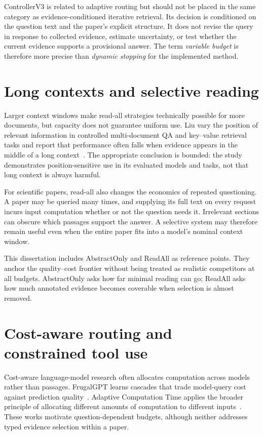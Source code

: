 ControllerV3 is related to adaptive routing but should not be placed in the same category as evidence-conditioned iterative retrieval. Its decision is conditioned on the question text and the paper's explicit structure. It does not revise the query in response to collected evidence, estimate uncertainty, or test whether the current evidence supports a provisional answer. The term \emph{variable budget} is therefore more precise than \emph{dynamic stopping} for the implemented method.

\section{Long contexts and selective reading}

Larger context windows make read-all strategies technically possible for more documents, but capacity does not guarantee uniform use. Liu \etal{} vary the position of relevant information in controlled multi-document QA and key--value retrieval tasks and report that performance often falls when evidence appears in the middle of a long context~\cite{liu2024lost}. The appropriate conclusion is bounded: the study demonstrates position-sensitive use in its evaluated models and tasks, not that long context is always harmful.

For scientific papers, read-all also changes the economics of repeated questioning. A paper may be queried many times, and supplying its full text on every request incurs input computation whether or not the question needs it. Irrelevant sections can obscure which passages support the answer. A selective system may therefore remain useful even when the entire paper fits into a model's nominal context window.

This dissertation includes AbstractOnly and ReadAll as reference points. They anchor the quality--cost frontier without being treated as realistic competitors at all budgets. AbstractOnly asks how far minimal reading can go; ReadAll asks how much annotated evidence becomes coverable when selection is almost removed.

\section{Cost-aware routing and constrained tool use}

Cost-aware language-model research often allocates computation across models rather than passages. FrugalGPT learns cascades that trade model-query cost against prediction quality~\cite{chen2024frugalgpt}. Adaptive Computation Time applies the broader principle of allocating different amounts of computation to different inputs~\cite{graves2016act}. These works motivate question-dependent budgets, although neither addresses typed evidence selection within a paper.

